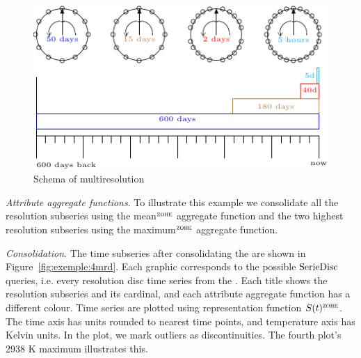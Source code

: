 \begin{figure}[tp]
  \centering
  \setlength{\unitlength}{1.3mm}
  \includegraphics{fig_exemple_window.pdf}
  \caption{Schema of multiresolution}
  \label{fig:exemple:window}
\end{figure}

\emph{Attribute aggregate functions}.  To illustrate this example we
consolidate all the resolution subseries using the mean$^\zohe{}$
aggregate function and the two highest resolution subseries using the
maximum$^\zohe{}$ aggregate function.

\emph{Consolidation}. The time subseries after consolidating the
 are shown in Figure~\ref{fig:exemple:4mrd}.  Each graphic
corresponds to the possible $\operatorname{SerieDisc}$ queries, i.e.  every
resolution disc time series from the . Each title shows
the resolution subseries and its cardinal, and each attribute
aggregate function has a different colour.
%
Time series are plotted using \zohe{} representation function
$S(t)^\zohe{}$. The time axis has  units rounded to nearest
time points, and temperature axis has Kelvin units. In the plot, we
mark outliers as discontinuities.  The fourth plot's 2938 K maximum
illustrates this.

